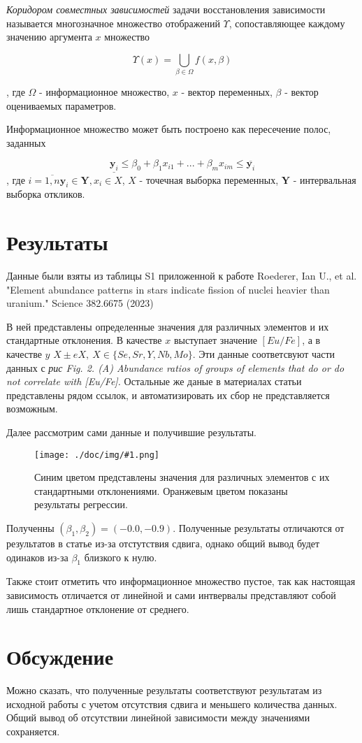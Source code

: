 \documentclass[a4paper,12pt]{article}
\newcommand{\plot}[3]{
    \begin{figure}[H]
        \begin{center}
            \texttt{[image: ./doc/img/\#1.png]}
            \caption{#2}
            \label{#3}
        \end{center}
    \end{figure}
}
\begin{document}
    \textsl{Коридором совместных зависимостей} задачи восстановления зависимости
    называется многозначное множество отображений $ \Upsilon $, сопоставляющее
    каждому значению аргумента $ x $ множество
    
    \begin{equation}
        \Upsilon(x) = \bigcup_{\beta \in \Omega} f(x, \beta)
    \end{equation}

    , где $ \Omega $ - информационное множество, $ x $ - вектор переменных, $ \beta $ - вектор оцениваемых параметров. 

    Информационное множество может быть построено как пересечение полос, заданных
    
    \begin{equation}
        \underline{\textbf{y}_i} \leq \beta_0 + \beta_1 x_{i1} + ... + \beta_m x_{im} \leq \overline{\textbf{y}_i}
    \end{equation}
    , где $ i = \overline{1, n} \textbf{y}_i \in \textbf{Y}, x_i \in X $, $ X $ - точечная выборка переменных,
    $ \textbf{Y} $ - интервальная выборка откликов.

    \section{Результаты}
    \quad Данные были взяты из таблицы S1 приложенной к работе Roederer, Ian U., et al. "Element abundance patterns in stars indicate fission of nuclei heavier than uranium." Science 382.6675 (2023)

    В ней представлены определенные значения для различных элементов и их стандартные отклонения.
    В качестве $x$ выступает значение $[Eu/Fe]$, а в качестве $y$ $X \pm eX,\ X \in \{Se, Sr, Y, Nb, Mo\}$.
    Эти данные соответсвуют части данных с \textit{рис Fig. 2. (A) Abundance ratios of groups of elements that do or do not correlate with [Eu/Fe]. }
    Остальные же даные в материалах статьи представлены рядом ссылок, и автоматизировать их сбор не представляется возможным.

    Далее рассмотрим сами данные и получившие результаты.

    \plot{Se Sr Y Nb Mo}{
        Синим цветом представлены значения для различных элементов с их стандартными отклонениями.
        Оранжевым цветом показаны результаты регрессии.
    }{linreg}

    
    Полученны $(\beta_1, \beta_2) = (-0.0, -0.9)$. Полученные результаты отличаются от результатов в статье из-за 
    отстутствия сдвига, однако общий вывод будет одинаков из-за $\beta_1$ близкого к нулю.

    Также стоит отметить что информационное множество пустое, так как настоящая зависимость отличается от линейной
    и сами интвервалы представляют собой лишь стандартное отклонение от среднего.

    \section{Обсуждение}
    \quad Можно сказать, что полученные результаты соответствуют результатам из исходной работы 
    с учетом отсутствия сдвига и меньшего количества данных. Общий вывод об отсутствии линейной 
    зависимости между значениями сохраняется.
\end{document}
